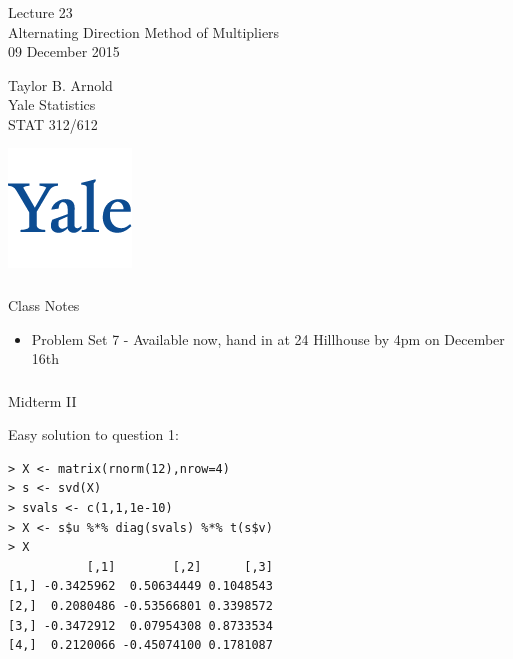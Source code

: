 



\begin{frame}[fragile] \frametitle{}

\vfill

{\fontsize{0.7cm}{0cm}\selectfont Lecture 23 \\\vspace{0.2cm}
Alternating Direction Method of Multipliers}\\\vspace{0.5cm}
09 December 2015

\vspace{2cm}

\begin{minipage}{0.6\textwidth}
Taylor B. Arnold \\
Yale Statistics  \\
STAT 312/612
\end{minipage}
\hfill
\begin{minipage}{0.3\textwidth}\raggedleft
\includegraphics[scale=0.3]{../yale-logo.png}
\end{minipage}%

\end{frame}

\begin{frame}[fragile] \frametitle{}

{\color{yaleblue}\fontsize{16pt}{20pt}\selectfont Class Notes}

\begin{itemize}
\item Problem Set 7 - Available now, hand in at 24 Hillhouse by 4pm on December 16th
\end{itemize}

\end{frame}

\begin{frame}[fragile] \frametitle{}

{\color{yaleblue}\fontsize{16pt}{20pt}\selectfont Midterm II}

Easy solution to question 1:
\begin{verbatim}
> X <- matrix(rnorm(12),nrow=4)
> s <- svd(X)
> svals <- c(1,1,1e-10)
> X <- s$u %*% diag(svals) %*% t(s$v)
> X
           [,1]        [,2]      [,3]
[1,] -0.3425962  0.50634449 0.1048543
[2,]  0.2080486 -0.53566801 0.3398572
[3,] -0.3472912  0.07954308 0.8733534
[4,]  0.2120066 -0.45074100 0.1781087
\end{verbatim}

\end{frame}

